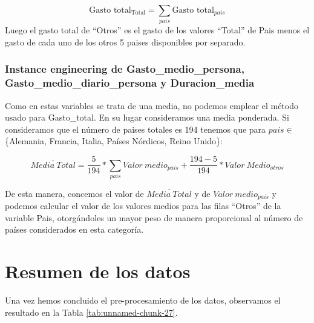 \documentclass[data,article,submit,moreauthors,pdftex]{Definitions/mdpi}
\begin{document}
\[ \text{Gasto total}_{\text{Total}} = \sum_{pais}{\text{Gasto total}_{pais}}\]
Luego el gasto total de ``Otros'' es el gasto de los valores ``Total''
de Pais menos el gasto de cada uno de los otros 5 paises disponibles por
separado.

\subsubsection{Instance engineering de Gasto\_medio\_persona,
Gasto\_medio\_diario\_persona y
Duracion\_media}\label{instance-engineering-de-gasto_medio_persona-gasto_medio_diario_persona-y-duracion_media}

Como en estas variables se trata de una media, no podemos emplear el
método usado para Gasto\_total. En su lugar consideramos una media
ponderada. Si consideramos que el número de paises totales es 194
tenemos que para \(pais \in\) \{Alemania, Francia, Italia, Países
Nórdicos, Reino Unido\}:

\[
 \overline{Media\ Total} = \frac{5}{194}*\sum_{pais}{Valor\ medio}_{pais} + \frac{194-5}{194}*Valor \ Medio_{otros}
\]

De esta manera, concemos el valor de \(\overline{Media\ Total}\) y de
\({Valor\ medio}_{pais}\) y podemos calcular el valor de los valores
medios para las filas ``Otros'' de la variable Pais, otorgándoles un
mayor peso de manera proporcional al número de países considerados en
esta categoría.

\section{Resumen de los datos}\label{resumen-de-los-datos}

Una vez hemos concluido el pre-procesamiento de los datos, observamos el
resultado en la Tabla \ref{tab:unnamed-chunk-27}.
\end{document}

